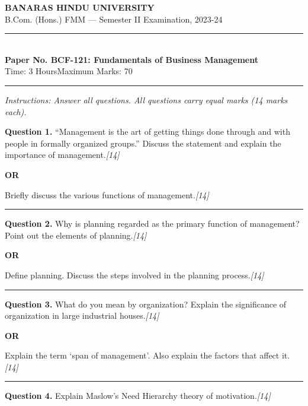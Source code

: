 \documentclass[11pt,a4paper]{article}
\newcommand{\pts}[1]{\hfill   \textit{[#1]}}
\begin{document}
\begin{center}
  {\large\bfseries BANARAS HINDU UNIVERSITY}\\[2pt]
  {\normalsize B.Com. (Hons.) FMM --- Semester II Examination, 2023-24}\\[6pt]
  \rule{0.8\linewidth}{0.5pt}\\[6pt]
  {\large\bfseries Paper No. BCF-121: Fundamentals of Business Management}\\[4pt]
  {\normalsize Time: 3 Hours\hfill Maximum Marks: 70}
\end{center}

\rule{\linewidth}{0.4pt}

\smallskip



\noindent   \textit{Instructions: Answer all questions. All questions carry equal marks (14 marks each).}

\bigskip




\noindent   \textbf{Question 1.}
``Management is the art of getting things done through and with people in formally organized groups.'' Discuss the statement and explain the importance of management.\pts{14}

\centerline{   \textbf{OR}}

Briefly discuss the various functions of management.\pts{14}

\medskip\rule{\linewidth}{0.2pt}




\noindent   \textbf{Question 2.}
Why is planning regarded as the primary function of management? Point out the elements of planning.\pts{14}

\centerline{   \textbf{OR}}

Define planning. Discuss the steps involved in the planning process.\pts{14}

\medskip\rule{\linewidth}{0.2pt}




\noindent   \textbf{Question 3.}
What do you mean by organization? Explain the significance of organization in large industrial houses.\pts{14}

\centerline{   \textbf{OR}}

Explain the term `span of management'. Also explain the factors that affect it.\pts{14}

\medskip\rule{\linewidth}{0.2pt}




\noindent   \textbf{Question 4.}
Explain Maslow's Need Hierarchy theory of motivation.\pts{14}
\end{document}
